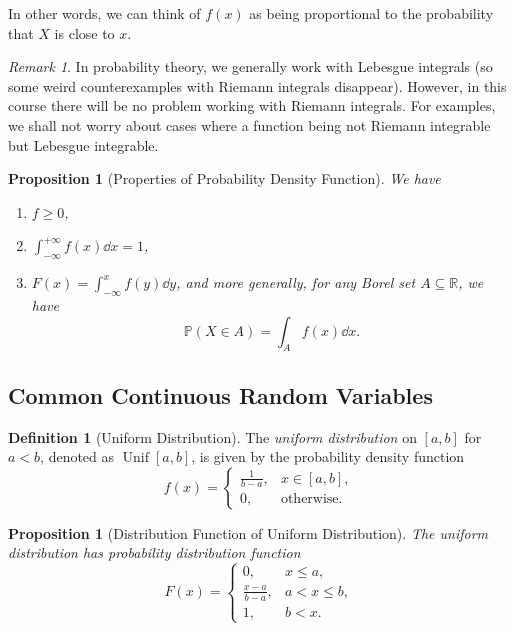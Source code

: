 \documentclass[11pt]{article}
\numberwithin{equation}{section}
\newtheorem{proposition}[theorem]{Proposition}
\theoremstyle{definition}
\newtheorem{definition}[theorem]{Definition}
\theoremstyle{remark}
\newtheorem{remark}[theorem]{Remark}
\newcommand{\pqty}[1]{\left(#1\right)}
\newcommand{\ccintv}[2]{[#1,#2]}
\newcommand{\RR}{\mathbb R}
\newcommand{\plusinfty}{+\infty}
\newcommand{\minusinfty}{-\infty}
\newcommand{\Prob}{\mathbb P}
\newcommand{\Uniform}{\operatorname{Unif}}
\begin{document}
In other words, we can think of \(f\pqty{x}\) as being proportional to the probability that \(X\) is close to \(x\).

\begin{remark}\label{probability-remark-007}
    In probability theory, we generally work with Lebesgue integrals (so some weird counterexamples with Riemann integrals disappear). However,  in this course there will be no problem working with Riemann integrals. For examples, we shall not worry about cases where a function being not Riemann integrable but Lebesgue integrable.
\end{remark}

\begin{proposition}[Properties of Probability Density Function]\label{probability-proposition-028}
    \label{probability-prop:properties-probability-density-function}%
    We have
    \begin{enumerate}
        \item \(f \geq 0\),
        \item \(\int_{\minusinfty}^{\plusinfty} f\pqty{x} \dd{x} = 1\),
        \item \(F\pqty{x} = \int_{\minusinfty}^{x} f\pqty{y} \dd{y}\), and more generally, for any Borel set \(A \subseteq \RR\), we have
        \[
            \Prob\pqty{X \in A} = \int_{A} f\pqty{x} \dd{x}.
        \]
    \end{enumerate}
\end{proposition}

\subsection{Common Continuous Random Variables}

\begin{definition}[Uniform Distribution]\label{probability-definition-045}
    \label{probability-def:uniform-distribution}%
    The \emph{uniform distribution} on \(\ccintv{a}{b}\) for \(a < b\), denoted as \(\Uniform\ccintv{a}{b}\), is given by the probability density function
    \[
        f\pqty{x} = \begin{cases}
            \frac{1}{b - a}, & x \in \ccintv{a}{b}, \\
            0, & \text{otherwise}.
        \end{cases}
    \]
\end{definition}

\begin{proposition}[Distribution Function of Uniform Distribution]\label{probability-proposition-029}
    \label{probability-prop:cdf-uniform}%
    The uniform distribution has probability distribution function
    \[
        F\pqty{x} = \begin{cases}
            0, & x \leq a, \\
            \frac{x - a}{b - a}, & a < x \leq b, \\
            1, & b < x.
        \end{cases}
    \]
\end{proposition}
\end{document}
